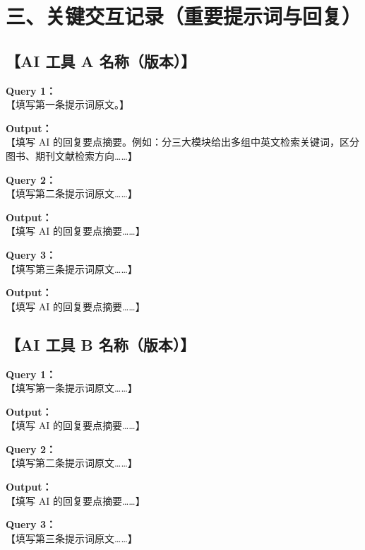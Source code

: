 \documentclass[a4paper,12pt]{article}
\begin{document}
\section*{三、关键交互记录（重要提示词与回复）}

\subsection*{\textbf{【AI 工具 A 名称（版本）】}}

\noindent\textbf{Query 1：}\\
【填写第一条提示词原文。】

\noindent\textbf{Output：}\\
【填写 AI 的回复要点摘要。例如：分三大模块给出多组中英文检索关键词，区分图书、期刊文献检索方向……】

\vspace{0.6em}
\noindent\textbf{Query 2：}\\
【填写第二条提示词原文……】

\noindent\textbf{Output：}\\
【填写 AI 的回复要点摘要……】

\vspace{0.6em}
\noindent\textbf{Query 3：}\\
【填写第三条提示词原文……】

\noindent\textbf{Output：}\\
【填写 AI 的回复要点摘要……】

\subsection*{\textbf{【AI 工具 B 名称（版本）】}}

\noindent\textbf{Query 1：}\\
【填写第一条提示词原文……】

\noindent\textbf{Output：}\\
【填写 AI 的回复要点摘要……】

\vspace{0.6em}
\noindent\textbf{Query 2：}\\
【填写第二条提示词原文……】

\noindent\textbf{Output：}\\
【填写 AI 的回复要点摘要……】

\vspace{0.6em}
\noindent\textbf{Query 3：}\\
【填写第三条提示词原文……】
\end{document}
